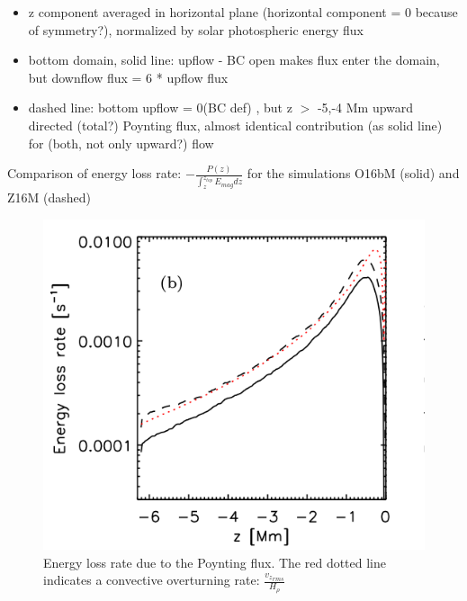 \documentclass{beamer}
\begin{document}
\begin{frame}

\begin{itemize}
\item z component averaged in horizontal plane (horizontal component = 0 because of symmetry?), 
normalized by solar photospheric energy flux
\item bottom domain, solid line: upflow - BC open makes flux enter the domain, but downflow flux = 6 * upflow flux
\item dashed line: bottom upflow = 0(BC def) , but z $>$ -5,-4 Mm upward directed (total?) Poynting flux, 
almost identical contribution (as solid line) for (both, not only upward?) flow 
\end{itemize}

\end{frame}
\begin{frame}{Comparison of energy loss rate: $-\frac{P(z)}{\int_z^{z_{top}}{E_{mag} dz }}$   for the simulations O16bM (solid) and Z16M (dashed)}

\begin{figure}[H]
 \centering
 \includegraphics[scale=0.3]{poynting2.png}
	\caption{Energy loss rate due to the Poynting flux. The
red dotted line indicates a convective overturning rate: $\frac{{v_z}_{rms}}{H_{\rho}}$}
\end{figure}

\end{frame}
\end{document}
